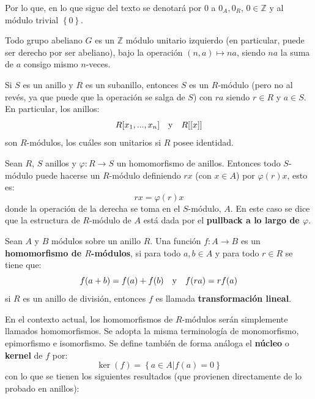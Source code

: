 \documentclass[12pt]{report}
\newcounter{it}
\theoremstyle{largebreak}
\newcommand\cf[3]{\ensuremath{#1:#2\rightarrow#3}}
\begin{document}
    Por lo que, en lo que sigue del texto se denotará por 0 a $0_A,0_R$, $0\in\mathbb{Z}$ y al módulo trivial $\left\{0\right\}$.

    \begin{exa}
        Todo grupo abeliano $G$ es un $\mathbb{Z}$ módulo unitario izquierdo (en particular, puede ser derecho por ser abeliano), bajo la operación $(n,a)\mapsto na $, siendo $na$ la suma de $a$ consigo mismo $n$-veces.
    \end{exa}

    \begin{exa}
        Si $S$ es un anillo y $R$ es un subanillo, entonces $S$ es un $R$-módulo (pero no al revés, ya que puede que la operación se salga de $S$) con $ra$ siendo $r\in R$ y $a\in S$. En particular, los anillos:
        \begin{equation*}
            R[x_1,...,x_n]\quad\textup{y}\quad R[[x]]
        \end{equation*}
        son $R$-módulos, los cuáles son unitarios si $R$ posee identidad.
    \end{exa}

    \begin{exa}
        Sean $R$, $S$ anillos y $\cf{\varphi}{R}{S}$ un homomorfismo de anillos. Entonces todo $S$-módulo puede hacerse un $R$-módulo definiendo $rx$ (con $x\in A$) por $\varphi(r)x$, esto es:
        \begin{equation*}
            rx=\varphi(r)x
        \end{equation*}
        donde la operación de la derecha se toma en el $S$-módulo, $A$. En este caso se dice que la estructura de $R$-módulo de $A$ está dada por el \textbf{pullback a lo largo de $\varphi$}.
    \end{exa}

    \begin{mydef}
        Sean $A$ y $B$ módulos sobre un anillo $R$. Una función $\cf{f}{A}{B}$ es un \textbf{homomorfismo de $R$-módulos}, si para todo $a,b\in A$ y para todo $r\in R$ se tiene que:
        \begin{equation*}
            f(a+b)=f(a)+f(b)\quad\textup{y}\quad f(ra)=rf(a)
        \end{equation*}
        si $R$ es un anillo de división, entonces $f$ es llamada \textbf{transformación lineal}.
    \end{mydef}

    En el contexto actual, los homomorfismos de $R$-módulos serán simplemente llamados homomorfismos. Se adopta la misma terminología de monomorfismo, epimorfismo e isomorfismo. Se define también de forma análoga el \textbf{núcleo} o \textbf{kernel} de $f$ por:
    \begin{equation*}
        \ker(f)=\left\{a\in A\Big|f(a)=0 \right\}
    \end{equation*}
    con lo que se tienen los siguientes resultados (que provienen directamente de lo probado en anillos):
\end{document}
